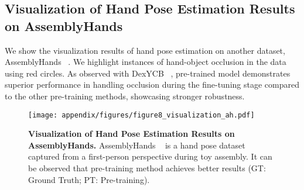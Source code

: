 \subsection{Visualization of Hand Pose Estimation Results on AssemblyHands}\label{sec:appendix_vis_ah}

We show the visualization results of hand pose estimation on another dataset, AssemblyHands ~\cite{ohkawa:cvpr23}. We highlight instances of hand-object occlusion in the data using red circles. As observed with DexYCB ~\citep{chao:cvpr21}, \Ours pre-trained model demonstrates superior performance in handling occlusion during the fine-tuning stage compared to the other pre-training methods, showcasing stronger robustness.

\begin{figure}[t!]
\vspace{-2mm}
    \begin{center}
    \texttt{[image: appendix/figures/figure8\_visualization\_ah.pdf]}
    \end{center}
    \vspace{-3mm}
    \caption{
    \textbf{Visualization of Hand Pose Estimation Results on AssemblyHands.}  AssemblyHands ~\cite{ohkawa:cvpr23} is a hand pose dataset captured from a first-person perspective during toy assembly. It can be observed that \Ours pre-training method achieves better results (GT: Ground Truth; PT: Pre-training).
   }
    \label{fig:vis_ah}
    \vspace{-5mm}
\end{figure}